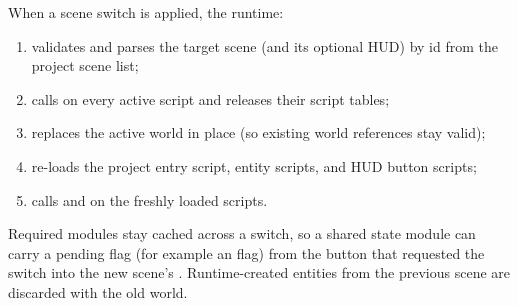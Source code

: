 When a scene switch is applied, the runtime:

\begin{enumerate}
  \item validates and parses the target scene (and its optional HUD) by id from the project scene list;
  \item calls  on every active script and releases their script tables;
  \item replaces the active world in place (so existing world references stay valid);
  \item re-loads the project entry script, entity scripts, and HUD button scripts;
  \item calls  and  on the freshly loaded scripts.
\end{enumerate}

Required modules stay cached across a switch, so a shared state module can carry a pending flag (for example an  flag) from the button that requested the switch into the new scene's . Runtime-created entities from the previous scene are discarded with the old world.
